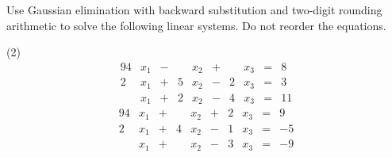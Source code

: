 \documentclass[../../../../Assignments]{subfiles}
\begin{document}
\begin{exercise}
    Use Gaussian elimination with backward substitution and two-digit rounding
    arithmetic to solve the following linear systems. Do not reorder the
    equations.

    \begin{tasks}(2)
        \task
            \begin{alignat*}{9}
                4&x_1 &{}-{}&  &x_2 &{}+{}&  &x_3 &{}={}&  8 \\
                2&x_1 &{}+{}& 5&x_2 &{}-{}& 2&x_3 &{}={}&  3 \\
                 &x_1 &{}+{}& 2&x_2 &{}-{}& 4&x_3 &{}={}& 11
            \end{alignat*}
        \task
            \begin{alignat*}{9}
                4&x_1 &{}+{}&  &x_2 &{}+{}& 2&x_3 &{}={}&  9 \\
                2&x_1 &{}+{}& 4&x_2 &{}-{}& 1&x_3 &{}={}& \num{-5} \\    %
                 &x_1 &{}+{}&  &x_2 &{}-{}& 3&x_3 &{}={}& \num{-9}
            \end{alignat*}
    \end{tasks}
\end{exercise}
\end{document}

